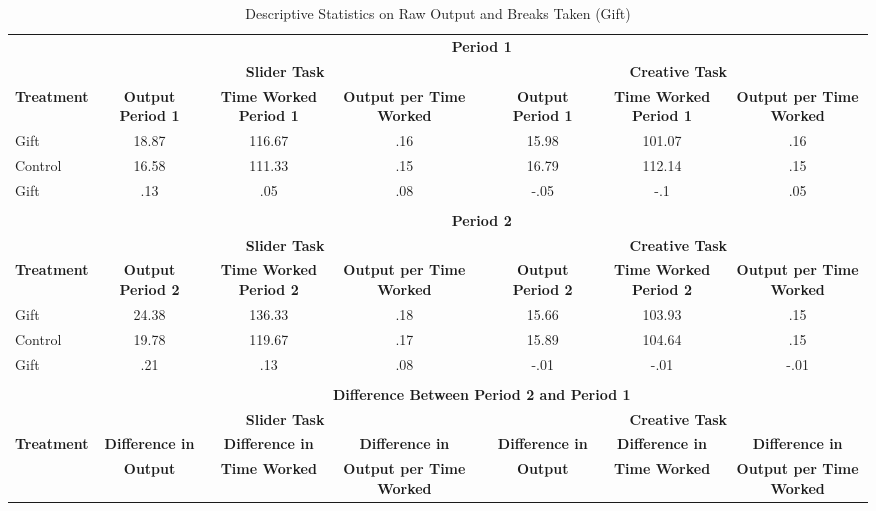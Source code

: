 \begin{landscape}
\begin{table}[h]%
\setlength\tabcolsep{2pt}
\caption{Descriptive Statistics on Raw Output and Breaks Taken (Gift)}
\begin{center}%
{\small\renewcommand{\arraystretch}{1}%
\begin{tabular}{lccccccc}
\hline\hline\noalign{\smallskip}
 & \multicolumn{7}{c}{\bf Period 1} \\
& \multicolumn{3}{c}{\bf Slider Task} & & \multicolumn{3}{c}{\bf Creative Task} \\ \cline{2-4} \cline{6-8}
\bf Treatment & \bf Output Period 1 & \bf Time Worked Period 1 & \bf Output per Time Worked && \bf Output Period 1 & \bf Time Worked Period 1 & \bf Output per Time Worked \\
\hline
Gift & 18.87 & 116.67 & .16 && 15.98 & 101.07 & .16 \\
Control & 16.58 & 111.33 & .15 && 16.79 & 112.14 & .15 \\
Gift & .13 & .05 & .08 && -.05 & -.1 & .05 \\
 \\
 & \multicolumn{7}{c}{\bf Period 2} \\
& \multicolumn{3}{c}{\bf Slider Task} & & \multicolumn{3}{c}{\bf Creative Task} \\ \cline{2-4} \cline{6-8}
\bf Treatment & \bf Output Period 2 & \bf Time Worked Period 2 & \bf Output per Time Worked && \bf Output Period 2 & \bf Time Worked Period 2 & \bf Output per Time Worked \\
\hline
Gift & 24.38 & 136.33 & .18 && 15.66 & 103.93 & .15 \\
Control & 19.78 & 119.67 & .17 && 15.89 & 104.64 & .15 \\
Gift & .21 & .13 & .08 && -.01 & -.01 & -.01 \\
 \\
 & \multicolumn{7}{c}{\bf Difference Between Period 2 and Period 1} \\
& \multicolumn{3}{c}{\bf Slider Task} & & \multicolumn{3}{c}{\bf Creative Task} \\ \cline{2-4} \cline{6-8}
\bf Treatment & \bf Difference in & \bf Difference in & \bf Difference in              && \bf Difference in & \bf Difference in & \bf Difference in            \\
& \bf Output            & \bf Time Worked       & \bf Output per Time Worked && \bf Output              & \bf Time Worked       & \bf Output per Time Worked \\

\end{tabular}}
\end{center}
\end{table}
\end{landscape}

